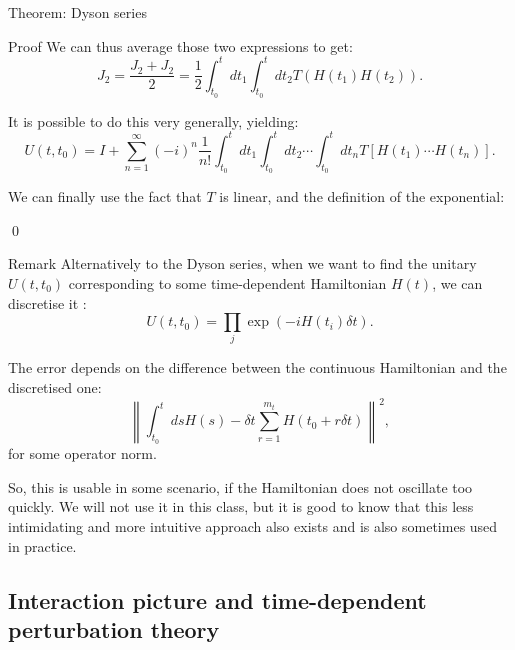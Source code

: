 \documentclass[a4paper]{article}
\begin{document}
\begin{parag}{Theorem: Dyson series}
\begin{subparag}{Proof}
        We can thus average those two expressions to get: 
        \[J_2 = \frac{J_2 + J_2}{2} = \frac{1}{2} \int_{t_0}^{t} dt_1 \int_{t_0}^{t} dt_2 T\left(H\left(t_1\right) H\left(t_2\right)\right).\]
        
        It is possible to do this very generally, yielding: 
        \[U\left(t, t_0\right) = I + \sum_{n=1}^{\infty} \left(-i\right)^n \frac{1}{n!} \int_{t_0}^{t} dt_1 \int_{t_0}^{t} dt_2 \cdots \int_{t_0}^{t} dt_n T\left[H\left(t_1\right) \cdots H\left(t_n\right)\right].\]
        
        We can finally use the fact that $T$ is linear, and the definition of the exponential: 

        \qed
    \end{subparag}
\end{parag}

\begin{parag}{Remark}
    Alternatively to the Dyson series, when we want to find the unitary $U\left(t, t_0\right)$ corresponding to some time-dependent Hamiltonian $H\left(t\right)$, we can discretise it :
    \[U\left(t, t_0\right) = \prod_{j} \exp\left(-i H\left(t_i\right) \delta t\right).\]
    
    The error depends on the difference between the continuous Hamiltonian and the discretised one: 
    \[\left\|\int_{t_0}^{t} ds H\left(s\right) - \delta t \sum_{r=1}^{m_t} H\left(t_0 + r \delta t\right)\right\|^2,\]
    for some operator norm.
    
    So, this is usable in some scenario, if the Hamiltonian does not oscillate too quickly. We will not use it in this class, but it is good to know that this less intimidating and more intuitive approach also exists and is also sometimes used in practice.
\end{parag}

\subsection[Interaction picture]{Interaction picture and time-dependent perturbation theory}
\end{document}
